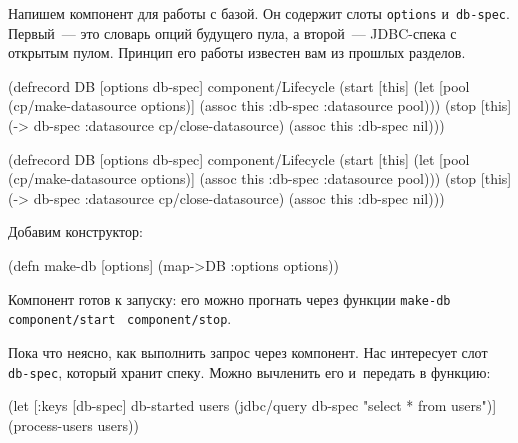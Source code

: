 Напишем компонент для работы с базой. Он содержит слоты \verb|options|
и~\verb|db-spec|. Первый~--- это словарь опций будущего пула, а второй~---
JDBC-спека с открытым пулом. Принцип его работы известен вам из прошлых
разделов.

\ifx\DEVICETYPE\MOBILE

\begin{english}
  \begin{clojure}
(defrecord DB [options db-spec]
  component/Lifecycle
  (start [this]
    (let [pool (cp/make-datasource
                 options)]
      (assoc this :db-spec
        {:datasource pool})))
  (stop [this]
    (-> db-spec
        :datasource
        cp/close-datasource)
    (assoc this :db-spec nil)))
  \end{clojure}
\end{english}

\else

\begin{english}
  \begin{clojure}
(defrecord DB [options db-spec]
  component/Lifecycle
  (start [this]
    (let [pool (cp/make-datasource options)]
      (assoc this :db-spec {:datasource pool})))
  (stop [this]
    (-> db-spec :datasource cp/close-datasource)
    (assoc this :db-spec nil)))
  \end{clojure}
\end{english}

\fi

\noindent
Добавим конструктор:

\begin{english}
  \begin{clojure}
(defn make-db [options]
  (map->DB {:options options}))
  \end{clojure}
\end{english}

Компонент готов к запуску: его можно прогнать через функции
\verb|make-db|~\arr{} \texttt{component\-/start}~\arr{} \verb|component/stop|.

Пока что неясно, как выполнить запрос через компонент. Нас интересует слот
\verb|db-spec|, который хранит спеку. Можно вычленить его и~передать в функцию:

\ifx\DEVICETYPE\MOBILE

\begin{english}
  \begin{clojure}
(let [{:keys [db-spec]} db-started
      users (jdbc/query db-spec
              "select * from users")]
  (process-users users))
  \end{clojure}
\end{english}


